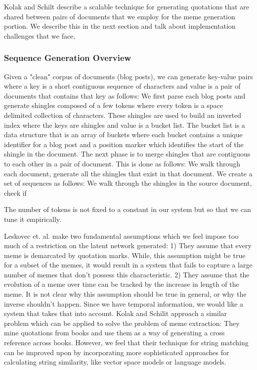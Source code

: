 \documentclass{acm_proc_article-sp}
\begin{document}
Kolak and Schilt \cite{kolak2008generating} describe a scalable technique for generating quotations that are shared between pairs of documents that we employ for the meme generation portion. We describe this in the next section and talk about implementation challenges that we face.

\subsubsection{Sequence Generation Overview}
Given a "clean" corpus of documents (blog posts), we can generate key-value pairs where a key is a short contiguous sequence of characters and value is a pair of documents that contains that key as follows: We first parse each blog posts and generate shingles composed of a few tokens where every token is a space delimited collection of characters. These shingles are used to build an inverted index where the keys are shingles and value is a bucket list. The bucket list is a data structure that is an array of buckets where each bucket contains a unique identifier for a blog post and a position marker which identifies the start of the shingle in the document. The next phase is to merge shingles that are contiguous to each other in a pair of document. This is done as follows: We walk through each document, generate all the shingles that exist in that document. We create a set of sequences as follows: We walk through the shingles in the source document, check if 




 The number of tokens is not fixed to a constant in our system but so that we can tune it empirically. 


  


Leskovec et. al.\cite{leskovec2009meme} make two fundamental assumptions which we feel impose too much of a restriction on the latent network generated: 1) They assume that every meme is demarcated by quotation marks. While, this assumption might be true for a subset of the memes, it would result in a system that fails to capture a large number of memes that don't possess this characteristic. 2) They assume that the evolution of a meme over time can be tracked by the increase in length of the meme. It is not clear why this assumption should be true in general, or why the inverse shouldn't happen. Since we have temporal information, we would like a system that takes that into account. Kolak and Schilit \cite{kolak2008generating} approach a similar problem which can be applied to solve the problem of meme extraction: They mine quotations from books and use them as a way of generating a cross reference across books. However, we feel that their technique for string matching can be improved upon by incorporating more sophisticated approaches for calculating string similarity, like vector space models or language models.
\end{document}
